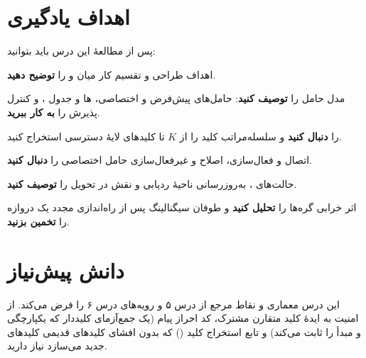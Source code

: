 \documentclass[11pt,a4paper]{article}
\begin{document}
\ACNcover

\section{اهداف یادگیری}
پس از مطالعهٔ این درس باید بتوانید:
\begin{objectives}
  \item اهداف طراحی  و تقسیم کار میان  و  را \textbf{توضیح دهید}.
  \item مدل حامل  را \textbf{توصیف کنید}: حامل‌های پیش‌فرض و اختصاصی، ها و جدول ، و
        کنترل پذیرش  را \textbf{به کار ببرید}.
  \item {} را \textbf{دنبال کنید} و سلسله‌مراتب کلید  را از $K$ تا کلیدهای لایهٔ دسترسی استخراج کنید.
  \item اتصال  و فعال‌سازی، اصلاح و غیرفعال‌سازی حامل اختصاصی را \textbf{دنبال کنید}.
  \item حالت‌های ، به‌روزرسانی ناحیهٔ ردیابی و نقش  در تحویل را \textbf{توصیف کنید}.
  \item اثر خرابی گره‌ها را \textbf{تحلیل کنید} و طوفان سیگنالینگ پس از راه‌اندازی مجدد یک دروازه را \textbf{تخمین بزنید}.
\end{objectives}

\section{دانش پیش‌نیاز}
این درس معماری و نقاط مرجع  از درس ۵ و رویه‌های  درس ۶ را فرض می‌کند. از امنیت به ایدهٔ کلید
متقارن مشترک، کد احراز پیام (یک جمع‌آزمای کلیددار که یکپارچگی و مبدأ را ثابت می‌کند) و تابع استخراج کلید ()
که بدون افشای کلیدهای قدیمی کلیدهای جدید می‌سازد نیاز دارید.
\end{document}
